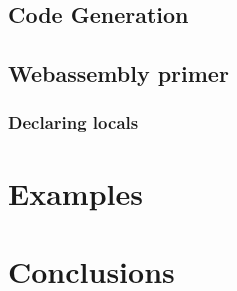 \documentclass{article}
\begin{document}

\subsection{Code Generation}




\subsection{Webassembly primer}

\subsubsection{Declaring locals}

\section{Examples}

\section{Conclusions}
\end{document}
